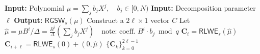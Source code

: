 \begin{algorithm}[ht!]
\caption{Client-side RGSW generation}
\label{alg:rgsw}
\begin{algorithmic}[1]
    \State \textbf{Input:} Polynomial $\mu = \sum_{j} b_j X^j,\quad b_j\in[0,N)$
    \State \textbf{Input:} Decomposition parameter $\ell$
    \State \textbf{Output:} $\mathsf{RGSW}_s(\mu)$
    \State Construct a $2\ell\times 1$ vector $C$
        \State Let $\hat{\mu} = \mu B^i/\Delta = \frac{B^i}{\Delta}(\sum_{j} b_j X^j) \quad \textrm{note: coeff.}\;B^i\cdot b_j \bmod{q}$
        \State $\mathbf{C}_i = \mathsf{RLWE}_s(\hat{\mu})$
        \State $\mathbf{C}_{i+\ell} = \mathsf{RLWE}_s(0) + (0, \hat{\mu})$
    \EndFor
    \State\Return $\{\mathbf{C}_k\}^{2\ell - 1}_{k=0}$
\end{algorithmic}
\end{algorithm}
